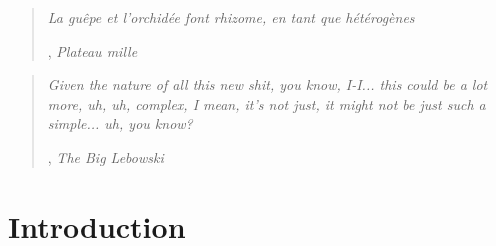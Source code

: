 \documentclass[]{article}
\begin{document}
{
\singlespacing
\small

\begin{quote}
\begin{flushright}
\textit{La guêpe et l'orchidée font rhizome, en tant que hétérogènes}\end{flushright}


\begin{flushright}
, \textit{Plateau mille} \end{flushright}

\end{quote}

\vspace{10mm}

\begin{quote}
    \begin{flushright}
    \textit{Given the nature of all this new shit, you know, I-I... this could be a lot more, uh, uh, complex, I mean, it's not just, it might not be just such a simple... uh, you know?} \end{flushright}

    \begin{flushright}
        , \textit{The Big Lebowski } 
    \end{flushright}
\end{quote}
}

\vspace{30mm}

{
\hypersetup{linkcolor=black}
\setcounter{tocdepth}{3}
\normalfont
\tableofcontents
}
\pagebreak



%
%

\hypertarget{introduction}{%
\section{Introduction}\label{introduction}}
\end{document}
